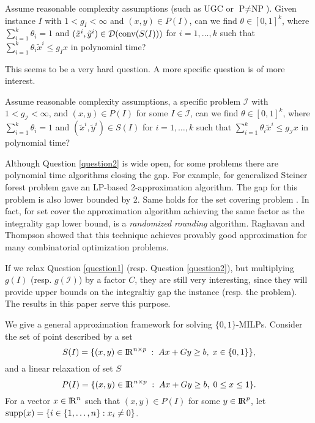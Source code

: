 \begin{question}\label{question1}
	Assume reasonable complexity assumptions (such as UGC or $\textrm{P}\neq \textrm{NP}$). Given instance $I$ with $1<g_I<\infty$ and $(x,y)\in P(I)$, can we find $\theta \in [0,1]^k$, where $\sum_{i=1}^{k}\theta_i =1$ and $(\tilde{x}^i,\tilde{y}^i)\in \operatorname{\mathcal{D}}(\operatorname{conv}(S(I)))$ for $i=1,\ldots,k$ such that $\sum_{i=1}^{k}\theta_i \tilde{x}^i\leq g_Ix$ in polynomial time?
\end{question}

This seems to be a very hard question. A more specific question is of more interest.

\begin{question}\label{question2}
	Assume reasonable complexity assumptions, a specific problem $\mathcal{I}$ with  $1<g_{\mathcal{I}}<\infty$, and $(x,y)\in P(I)$ for some $I\in \mathcal{I}$, can we find $\theta \in [0,1]^k$, where $\sum_{i=1}^{k}\theta_i =1$ and $(\tilde{x}^i,\tilde{y}^i)\in S(I)$ for $i=1,\ldots,k$ such that $\sum_{i=1}^{k}\theta_i \tilde{x}^i\leq g_{\mathcal{I}}x$ in polynomial time?
\end{question}
Although Question \ref{question2} is wide open, for some problems there are polynomial time algorithms closing the gap. For example, for generalized Steiner forest problem \cite{jain} gave an LP-based 2-approximation algorithm. The gap for this problem is also lower bounded by 2. Same holds for the set covering problem \cite{randomizedrounding}. In fact, for set cover the approximation algorithm achieving the same factor as the integrality gap lower bound, is a \textit{randomized rounding} algorithm. Raghavan and Thompson \cite{randomizedrounding} showed that this technique achieves provably good approximation for many combinatorial optimization problems.  

If we relax Question \ref{question1} (resp. Question \ref{question2}), but multiplying $g(I)$ (resp. $g(\mathcal{I})$) by a factor $C$, they are still very interesting, since they will provide upper bounds on the integraltiy gap the instance (resp. the problem). The results in this paper serve this purpose.

We give a general approximation framework for solving $\{0,1\}$-MILPs.  Consider the set of point described by a set 
\begin{equation}
S(I)= \{(x,y)\in {\rm I\!R}^{n\times p}\;:\; Ax+Gy\geq b,\; x\in \{0,1\}\},  \label{S'} 
\end{equation}
and a linear relaxation of set $S$
\begin{equation}
P(I) = \{(x,y)\in {\rm I\!R}^{n\times p}\;:\; Ax+Gy\geq b,\; 0 \leq x\leq 1\}. \label{P'}
\end{equation}
For a vector $x\in {\rm I\!R}^n$ such that $(x,y)\in P(I)$ for some $y\in {\rm I\!R}^p$, let $\operatorname{supp}(x)= \{i \in \{1,\ldots,n\}: x_i \neq 0\}$. 


